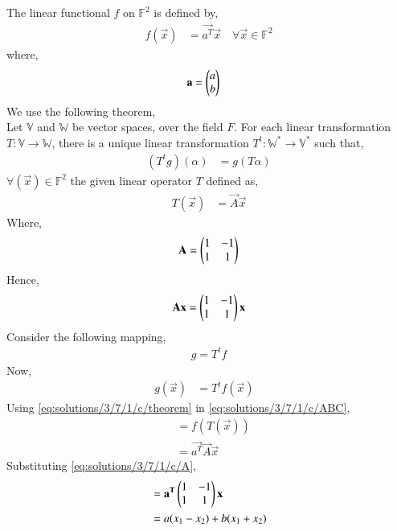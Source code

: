 The linear functional $f$ on $\mathbb{F}^2$ is defined by,
\begin{align}
f(\vec{x}) &= \vec{a^T}\vec{x}
\quad{\text{$\forall \vec{x} \in \mathbb{F}^2$}}\label{eq:solutions/3/7/1/c/def}
\end{align}
where,
\begin{align}
\mathbf{a} &= \begin{pmatrix}a\\b\end{pmatrix}
\end{align}
We use the following theorem,\\
Let $\mathbb{V}$ and $\mathbb{W}$ be vector spaces, over the field $F$. For each linear transformation $T: \mathbb{V} \xrightarrow{} \mathbb{W}$, there is a unique linear transformation $T^t: \mathbb{W}^* \xrightarrow{} \mathbb{V}^*$ such that,
\begin{align}
(T^tg)(\alpha) &= g(T\alpha)\label{eq:solutions/3/7/1/c/theorem}
\end{align}
$\forall (\vec{x}) \in \mathbb{F}^2$ the given linear operator $T$ defined as,
\begin{align}
T(\vec{x}) &= \vec{A}\vec{x}
\end{align}
Where,
\begin{align}
\mathbf{A}=\begin{pmatrix}1&-1\\1&1\end{pmatrix}\label{eq:solutions/3/7/1/c/A}
\end{align}
Hence,
\begin{align}
\mathbf{A}\mathbf{x}=\begin{pmatrix}1&-1\\1&1\end{pmatrix}\mathbf{x} \label{eq:solutions/3/7/1/c/qn}
\end{align}
Consider the following mapping,
\begin{align}
g = T^tf\label{eq:solutions/3/7/1/c/map}
\end{align}
Now,
\begin{align}
g(\vec{x}) &= T^tf(\vec{x})&\label{eq:solutions/3/7/1/c/ABC}
\end{align}
Using \eqref{eq:solutions/3/7/1/c/theorem} in \eqref{eq:solutions/3/7/1/c/ABC},
\begin{align}
&= f(T(\vec{x}))\\
&= \vec{a^T}\vec{A}\vec{x}
\end{align}
Substituting \eqref{eq:solutions/3/7/1/c/A},
\begin{align}
&= \mathbf{a^T}\begin{pmatrix}1&-1\\1&1\end{pmatrix}\mathbf{x}\\
&= a(x_1-x_2)+b(x_1+x_2) \label{eq:solutions/3/7/1/c/ans}
\end{align}


